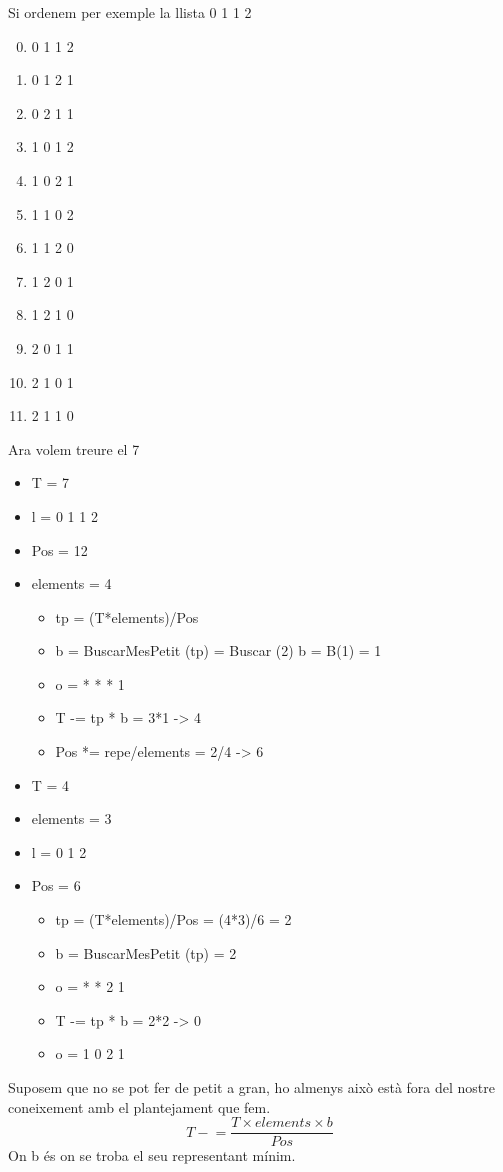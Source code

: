 \documentclass{article}
\begin{document}
Si ordenem per exemple la llista 0 1 1 2
\begin{enumerate}
\setcounter{enumi}{-1}
\item 0 1 1 2
\item 0 1 2 1
\item 0 2 1 1
\item 1 0 1 2
\item 1 0 2 1
\item 1 1 0 2
\item 1 1 2 0
\item 1 2 0 1
\item 1 2 1 0
\item 2 0 1 1
\item 2 1 0 1
\item 2 1 1 0
\end{enumerate}

Ara volem treure el 7
\begin{itemize}
\item T = 7
\item l = 0 1 1 2
\item Pos = 12
\item elements = 4
	\begin{itemize}
	\item tp = (T*elements)/Pos
	\item b = BuscarMesPetit (tp) = Buscar (2)
		\subitem b = B(1) = 1
	\item o = * * * 1
	\item T -= tp * b = 3*1 -> 4
	\item Pos *= repe/elements = 2/4 -> 6
	\end{itemize}

\item T = 4
\item elements = 3
\item l = 0 1 2
\item Pos = 6
	\begin{itemize}
	\item tp = (T*elements)/Pos = (4*3)/6 = 2
	\item b = BuscarMesPetit (tp) = 2
	\item o = * * 2 1
	\item T -= tp * b = 2*2 -> 0
	\item o = 1 0 2 1
	\end{itemize}
\end{itemize}

Suposem que no se pot fer de petit a gran, ho almenys això està fora del nostre coneixement amb el plantejament que fem.
$$T -\!\!\!= \frac{T \times elements \times b}{Pos}$$
On b és on se troba el seu representant mínim.\\
\end{document}
